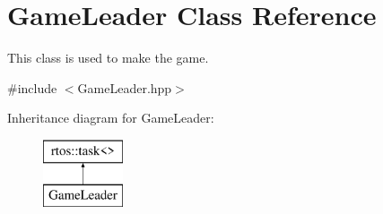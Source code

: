 \hypertarget{class_game_leader}{}\section{Game\+Leader Class Reference}
\label{class_game_leader}


This class is used to make the game.  




{\ttfamily \#include $<$Game\+Leader.\+hpp$>$}

Inheritance diagram for Game\+Leader\+:\begin{figure}[H]
\begin{center}
\leavevmode
\includegraphics[height=2.000000cm]{class_game_leader}
\end{center}
\end{figure}
